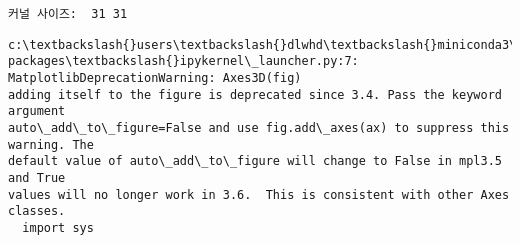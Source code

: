 \documentclass[11pt]{article}
\begin{document}
    \begin{Verbatim}[commandchars=\\\{\}]
커널 사이즈:  31 31
    \end{Verbatim}

    \begin{Verbatim}[commandchars=\\\{\}]
c:\textbackslash{}users\textbackslash{}dlwhd\textbackslash{}miniconda3\textbackslash{}envs\textbackslash{}mlstudy\textbackslash{}lib\textbackslash{}site-
packages\textbackslash{}ipykernel\_launcher.py:7: MatplotlibDeprecationWarning: Axes3D(fig)
adding itself to the figure is deprecated since 3.4. Pass the keyword argument
auto\_add\_to\_figure=False and use fig.add\_axes(ax) to suppress this warning. The
default value of auto\_add\_to\_figure will change to False in mpl3.5 and True
values will no longer work in 3.6.  This is consistent with other Axes classes.
  import sys
    \end{Verbatim}

    \begin{center}
    \end{center}
    { \hspace*{\fill} \\}
    

    
    
    
\end{document}
